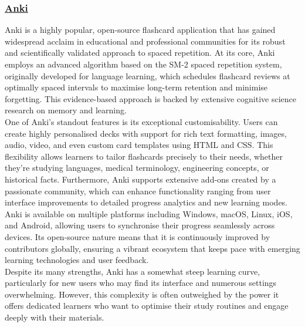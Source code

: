 \documentclass[a4paper,12pt]{article}
\begin{document}
\subsubsection{\underline{Anki}}

Anki is a highly popular, open-source flashcard application that has gained widespread acclaim in educational and professional communities for its robust and scientifically validated approach to spaced repetition. At its core, Anki employs an advanced algorithm based on the SM-2 spaced repetition system, originally developed for language learning, which schedules flashcard reviews at optimally spaced intervals to maximise long-term retention and minimise forgetting. This evidence-based approach is backed by extensive cognitive science research on memory and learning. \\

One of Anki’s standout features is its exceptional customisability. Users can create highly personalised decks with support for rich text formatting, images, audio, video, and even custom card templates using HTML and CSS. This flexibility allows learners to tailor flashcards precisely to their needs, whether they’re studying languages, medical terminology, engineering concepts, or historical facts. Furthermore, Anki supports extensive add-ons created by a passionate community, which can enhance functionality ranging from user interface improvements to detailed progress analytics and new learning modes. \\

Anki is available on multiple platforms including Windows, macOS, Linux, iOS, and Android, allowing users to synchronise their progress seamlessly across devices. Its open-source nature means that it is continuously improved by contributors globally, ensuring a vibrant ecosystem that keeps pace with emerging learning technologies and user feedback. \\

Despite its many strengths, Anki has a somewhat steep learning curve, particularly for new users who may find its interface and numerous settings overwhelming. However, this complexity is often outweighed by the power it offers dedicated learners who want to optimise their study routines and engage deeply with their materials. \\
\end{document}
